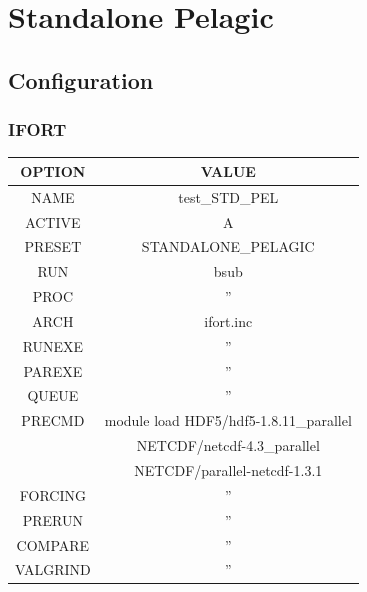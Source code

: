 
\section{Standalone Pelagic}\label{sec:standalonepel}
\subsection{Configuration}
\subsubsection{IFORT}
\begin{tabular}{|c|c|}
\hline
\hline
\rowcolor{LightCyan}
{\bf OPTION}   & {\bf VALUE} \\
\hline    
NAME     & test\_STD\_PEL \\
\hline       
ACTIVE   & A \\
\hline       
PRESET   & STANDALONE\_PELAGIC \\
\hline        
RUN      & bsub \\
\hline        
PROC     & '' \\
\hline    
ARCH     & ifort.inc \\
\hline    
RUNEXE   & '' \\
\hline    
PAREXE   & '' \\
\hline    
QUEUE    & '' \\
\hline    
PRECMD   & module load HDF5/hdf5-1.8.11\_parallel \\
         & NETCDF/netcdf-4.3\_parallel \\
         & NETCDF/parallel-netcdf-1.3.1 \\
\hline    
FORCING  & '' \\
\hline    
PRERUN   & '' \\
\hline    
COMPARE  & '' \\
\hline    
VALGRIND & '' \\
\hline    
\end{tabular}


